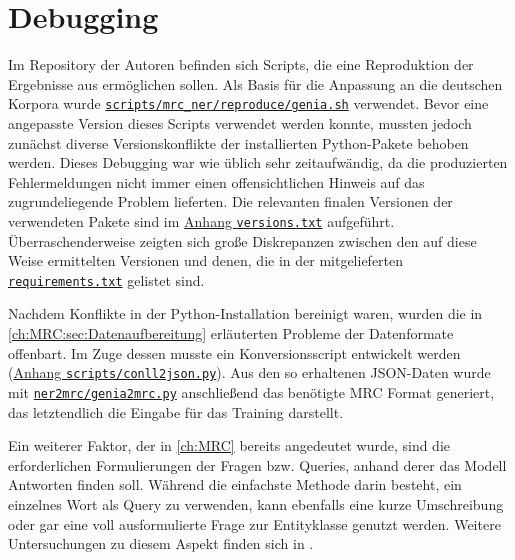 \section{Debugging}
\label{ch:Training:sec:Debugging}

Im Repository der Autoren befinden sich Scripts, die eine Reproduktion der Ergebnisse aus \textcite{li2019unified} ermöglichen sollen. Als Basis für die Anpassung an die deutschen Korpora wurde \href{https://github.com/ShannonAI/mrc-for-flat-nested-ner/blob/457b0759f7fd462d0abd0a23441726352716fff9/scripts/mrc_ner/reproduce/genia.sh}{\texttt{scripts/mrc\_ner/reproduce/genia.sh}} verwendet. Bevor eine angepasste Version dieses Scripts verwendet werden konnte, mussten jedoch zunächst diverse Versionskonflikte der installierten Python-Pakete behoben werden. Dieses Debugging war wie üblich sehr zeitaufwändig, da die produzierten Fehlermeldungen nicht immer einen offensichtlichen Hinweis auf das zugrundeliegende Problem lieferten. Die relevanten finalen Versionen der verwendeten Pakete sind im \hyperref[app:versions]{Anhang \texttt{versions.txt}} aufgeführt. Überraschenderweise zeigten sich große Diskrepanzen zwischen den auf diese Weise ermittelten Versionen und denen, die in der mitgelieferten \href{https://github.com/ShannonAI/mrc-for-flat-nested-ner/blob/457b0759f7fd462d0abd0a23441726352716fff9/requirements.txt}{\texttt{requirements.txt}} gelistet sind.

Nachdem Konflikte in der Python-Installation bereinigt waren, wurden die in \autoref{ch:MRC:sec:Datenaufbereitung} erläuterten Probleme der Datenformate offenbart. Im Zuge dessen musste ein Konversionsscript entwickelt werden (\hyperref[app:conll2json]{Anhang \texttt{scripts/conll2json.py}}). Aus den so erhaltenen JSON-Daten wurde mit \href{https://github.com/ShannonAI/mrc-for-flat-nested-ner/blob/457b0759f7fd462d0abd0a23441726352716fff9/ner2mrc/genia2mrc.py}{\texttt{ner2mrc/genia2mrc.py}} anschließend das benötigte MRC Format generiert, das letztendlich die Eingabe für das Training darstellt.

Ein weiterer Faktor, der in \autoref{ch:MRC} bereits angedeutet wurde, sind die erforderlichen Formulierungen der Fragen bzw. Queries, anhand derer das Modell Antworten finden soll. Während die einfachste Methode darin besteht, ein einzelnes Wort als Query zu verwenden, kann ebenfalls eine kurze Umschreibung oder gar eine voll ausformulierte Frage zur Entityklasse genutzt werden. Weitere Untersuchungen zu diesem Aspekt finden sich in \textcite{li2019unified}.

